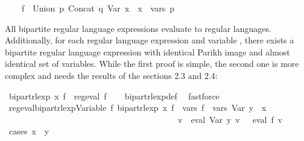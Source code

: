 \begin{isabellebody}
\ \ \ \ f\ {\isacharequal}{\kern0pt}\ Union\ p\ {\isacharparenleft}{\kern0pt}Concat\ q\ {\isacharparenleft}{\kern0pt}Var\ x{\isacharparenright}{\kern0pt}{\isacharparenright}{\kern0pt}\ {\isasymand}\ x\ {\isasymnotin}\ vars\ p{\isachardoublequoteclose}%
\begin{isamarkuptext}%
All bipartite regular language expressions evaluate to regular languages. Additionally,
for each  regular language expression and variable , there exists a bipartite
regular language expression with identical Parikh image and almost identical set of variables.
While the first proof is simple, the second one is more complex and needs the results of the
sections 2.3 and 2.4:%
\end{isamarkuptext}\isamarkuptrue%
\isamarkupfalse%
\ {\isachardoublequoteopen}bipart{\isacharunderscore}{\kern0pt}rlexp\ x\ f\ {\isasymLongrightarrow}\ reg{\isacharunderscore}{\kern0pt}eval\ f{\isachardoublequoteclose}\isanewline
%
\isadelimproof
\ \ %
\endisadelimproof
%
\isatagproof
{}\isamarkupfalse%
\ bipart{\isacharunderscore}{\kern0pt}rlexp{\isacharunderscore}{\kern0pt}def\ \isamarkupfalse%
\ fastforce%
\endisatagproof
{\isafoldproof}%
%
\isadelimproof
\isanewline
%
\endisadelimproof
\isanewline
\isanewline
{}\isamarkupfalse%
\ reg{\isacharunderscore}{\kern0pt}eval{\isacharunderscore}{\kern0pt}bipart{\isacharunderscore}{\kern0pt}rlexp{\isacharunderscore}{\kern0pt}Variable{\isacharcolon}{\kern0pt}\ {\isachardoublequoteopen}{\isasymexists}f{\isacharprime}{\kern0pt}{\isachardot}{\kern0pt}\ bipart{\isacharunderscore}{\kern0pt}rlexp\ x\ f{\isacharprime}{\kern0pt}\ {\isasymand}\ vars\ f{\isacharprime}{\kern0pt}\ {\isacharequal}{\kern0pt}\ vars\ {\isacharparenleft}{\kern0pt}Var\ y{\isacharparenright}{\kern0pt}\ {\isasymunion}\ {\isacharbraceleft}{\kern0pt}x{\isacharbraceright}{\kern0pt}\isanewline
\ \ \ \ \ \ \ \ \ \ \ \ \ \ \ \ \ \ \ \ \ \ \ \ \ \ \ \ \ \ \ \ \ \ \ \ \ \ \ \ {\isasymand}\ {\isacharparenleft}{\kern0pt}{\isasymforall}v{\isachardot}{\kern0pt}\ {\isasymPsi}\ {\isacharparenleft}{\kern0pt}eval\ {\isacharparenleft}{\kern0pt}Var\ y{\isacharparenright}{\kern0pt}\ v{\isacharparenright}{\kern0pt}\ {\isacharequal}{\kern0pt}\ {\isasymPsi}\ {\isacharparenleft}{\kern0pt}eval\ f{\isacharprime}{\kern0pt}\ v{\isacharparenright}{\kern0pt}{\isacharparenright}{\kern0pt}{\isachardoublequoteclose}\isanewline
%
\isadelimproof
%
\endisadelimproof
%
\isatagproof
{}\isamarkupfalse%
\ {\isacharparenleft}{\kern0pt}cases\ {\isachardoublequoteopen}x\ {\isacharequal}{\kern0pt}\ y{\isachardoublequoteclose}{\isacharparenright}{\kern0pt}\isanewline

\end{isabellebody}

